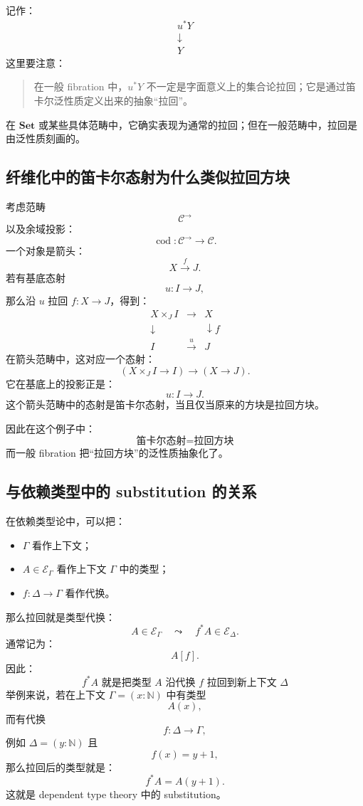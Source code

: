 \documentclass[12pt,a4paper]{article}
\begin{document}
记作：
\[
\begin{array}{c}
u^*Y\\
\downarrow\\
Y
\end{array}
\]
这里要注意：
\begin{quote}
在一般 fibration 中，\(u^*Y\) 不一定是字面意义上的集合论拉回；它是通过笛卡尔泛性质定义出来的抽象“拉回”。
\end{quote}
在 \(\mathbf{Set}\) 或某些具体范畴中，它确实表现为通常的拉回；但在一般范畴中，拉回是由泛性质刻画的。

\subsection{纤维化中的笛卡尔态射为什么类似拉回方块}

考虑范畴
\[
\mathcal{C}^\to
\]
以及余域投影：
\[
\operatorname{cod}:\mathcal{C}^\to\to\mathcal{C}.
\]
一个对象是箭头：
\[
X\xrightarrow{f}J.
\]
若有基底态射
\[
u:I\to J,
\]
那么沿 \(u\) 拉回 \(f:X\to J\)，得到：
\[
\begin{array}{ccc}
X\times_J I&\to&X\\
\downarrow&&\downarrow f\\
I&\xrightarrow{u}&J
\end{array}
\]
在箭头范畴中，这对应一个态射：
\[
(X\times_J I\to I)\longrightarrow(X\to J).
\]
它在基底上的投影正是：
\[
u:I\to J.
\]
这个箭头范畴中的态射是笛卡尔态射，当且仅当原来的方块是拉回方块。

因此在这个例子中：
\[
\boxed{
\text{笛卡尔态射}
=
\text{拉回方块}
}
\]
而一般 fibration 把“拉回方块”的泛性质抽象化了。

\subsection{与依赖类型中的 substitution 的关系}

在依赖类型论中，可以把：
\begin{itemize}
  \item \(\Gamma\) 看作上下文；
  \item \(A\in\mathcal{E}_\Gamma\) 看作上下文 \(\Gamma\) 中的类型；
  \item \(f:\Delta\to\Gamma\) 看作代换。
\end{itemize}
那么拉回就是类型代换：
\[
A\in\mathcal{E}_\Gamma
\quad\leadsto\quad
f^*A\in\mathcal{E}_\Delta.
\]
通常记为：
\[
A[f].
\]
因此：
\[
\boxed{
f^*A
\text{ 就是把类型 }A\text{ 沿代换 }f\text{ 拉回到新上下文 }\Delta
}
\]
举例来说，若在上下文 \(\Gamma=(x:\mathbb{N})\) 中有类型
\[
A(x),
\]
而有代换
\[
f:\Delta\to\Gamma,
\]
例如 \(\Delta=(y:\mathbb{N})\) 且
\[
f(x)=y+1,
\]
那么拉回后的类型就是：
\[
f^*A=A(y+1).
\]
这就是 dependent type theory 中的 substitution。
\end{document}
